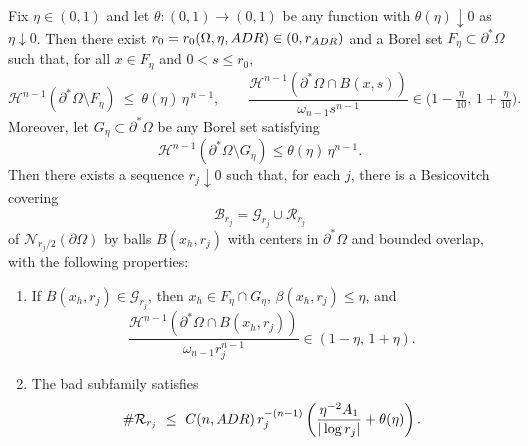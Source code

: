 \documentclass[10pt,a4paper]{amsart}
\newcommand{\Ncal}{\mathcal{N}}
\begin{document}
\begin{prop}\label{prop:ADR}
Fix $\eta\in(0,1)$ and let $\theta:(0,1)\to(0,1)$ be any function with $\theta(\eta)\downarrow 0$ as $\eta\downarrow 0$.
Then there exist $r_0=r_0(\Omega,\eta,{\rm ADR})\in(0,r_{\rm ADR})$ and a Borel set $F_\eta\subset\partial^*\Omega$ such that, for all $x \in F_\eta$ and $0<s\leq r_0$,
\begin{equation}\label{eq:Egorov}
  \mathscr H^{n-1}(\partial^*\Omega\setminus F_\eta)\ \le\ \theta(\eta)\,\eta^{\,n-1},\qquad
  \frac{\mathscr H^{n-1}(\partial^*\Omega\cap B(x,s))}{\omega_{n-1}s^{n-1}}\in\Big(1-\tfrac{\eta}{10},\,1+\tfrac{\eta}{10}\Big).
\end{equation}
{Moreover, let $G_\eta\subset\partial^*\Omega$ be any Borel set satisfying}
\[
{
\mathscr H^{n-1}(\partial^*\Omega\setminus G_\eta)\le \theta(\eta)\,\eta^{n-1}.
}
\]
{Then there exists a sequence $r_j\downarrow0$ such that, for each $j$, there is a Besicovitch covering}
\[
{
\mathcal B_{r_j}=\mathcal G_{r_j}\cup\mathcal R_{r_j}
}
\]
{of $\Ncal_{r_j/2}(\partial\Omega)$ by balls $B(x_h,r_j)$ with centers in $\partial^*\Omega$ and bounded overlap, with the following properties:}

\begin{enumerate}
\item\label{item:gooddensity}
{If $B(x_h,r_j)\in\mathcal G_{r_j}$, then $x_h\in F_\eta\cap G_\eta$, $\beta(x_h,r_j)\le\eta$, and}
\[
{
  \frac{\mathscr H^{n-1}(\partial^*\Omega\cap B(x_h,r_j))}{\omega_{n-1}r_j^{n-1}}\in(1-\eta,\,1+\eta).
}
\]

\item\label{item:badcount}
{The bad subfamily satisfies}
\[
{
  \#\mathcal R_{r_j}\ \le\ C(n,{\rm ADR})\,r_j^{-(n-1)}
  \left(\frac{\eta^{-2}A_1}{|\log r_j|}+\theta(\eta)\right).
}
\]
\end{enumerate}
\end{prop}
\end{document}
